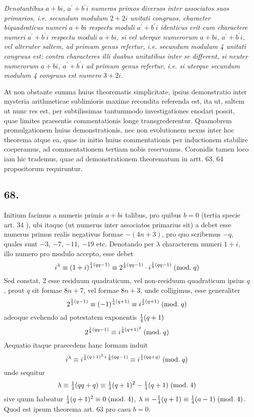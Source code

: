 \documentclass[twoside,12pt, showframe]{memoir}
\renewcommand{\pmod}[1]{\;(\textrm{mod.}\;#1)}
\let\oldfrac\frac
\def\frac#1#2{\mathchoice{\tfrac{#1}{#2}}{\oldfrac{#1}{#2}}{\genfrac{}{}{}{2}{#1}{#2\mathstrut}}{\genfrac{}{}{}{3}{#1}{#2\mathstrut}}}
\begin{document}
\textit{Denotantibus \(a+b i\), \( a^{\prime}+b^{\prime} i\) numeros primos diversos inter associatos suos primarios, i.e. secundum modulum \(2+2 i\) unitati congruos, character biquadraticus numeri \(a+b i\) respectu moduli \(a^{\prime}+b^{\prime} i\) identicus erit cum charactere numeri \(a^{\prime}+b^{\prime} i\) respectu moduli \(a+b i\), si vel uterque numerorum \(a+b i\), \(a^{\prime}+b^{\prime} i\), vel alteruter saltem, ad primum genus refertur, i.e. secundum modulum 4 unitati congruus est: contra characteres illi duabus unitatibus inter se different, si neuter numerorum \(a+b i\), \(a^{\prime}+b^{\prime} i\) ad primum genus refertur, i.e. si uterque secundum modulum 4 congruus est numero \(3+2 i\).}\clearpage\noindent%
 
At non obstante summa huius theorematis simplicitate, ipsius demonstratio inter mysteria arithmeticae sublimioris maxime recondita referenda est, ita ut, saltem ut nunc res est, per subtilissimas tantummodo investigationes enodari possit, quae limites praesentis commentationis longe transgrederentur. Quamobrem promulgationem huius demonstrationis, nec non evolutionem nexus inter hoc theorema atque ea, quae in initio huius commentationis per inductionem stabilire coeperamus, ad commentationem tertiam nobis reservamus. Coronidis tamen loco iam hic trademus, quae ad demonstrationem theorematum in artt. 63, 64 propositorum requiruntur.

\subsection*{68.}
 
Initium facimus a numeris primis \(a+b i\) talibus, pro quibus \(b=0\) (tertia specie art. 34 ), ubi itaque (ut numerus inter associatos primarius sit) a debet esse numerus primus realis negativus formae \(-(4 n+3)\), pro quo scribemus \(-q\), quales sunt \(-3\), \(-7\), \(-11\), \(-19\) etc. Denotando per \(\lambda\) characterem numeri \(1+i\), illo numero pro modulo accepto, esse debet
\[i^{\lambda} \equiv(1+i)^{\frac{1}{4}(q q-1)} \equiv 2^{\frac{1}{8}(q q-1)} \cdot i^{\frac{1}{8}(q q-1)}\pmod{q}\]
Sed constat, 2 esse residuum quadraticum, vel non-residuum quadraticum ipsius \(q\), prout \(q\) sit formae \(8 n+7\), vel formae \(8 n+3\), unde colligimus, esse generaliter
\[2^{\frac{1}{2}(q-1)} \equiv(-1)^{\frac{1}{4}(q+1)} \equiv i^{\frac{1}{2}(q+1)}\pmod{q}\]
adeoque evehendo ad potestatem exponentis \(\frac{1}{4}(q+1)\)
\[2^{\frac{1}{8}(q q-1)} \equiv i^{\frac{1}{8}(q+1)^{2}}\pmod{q}\]
Aequatio itaque praecedens hanc formam induit
\[i^{\lambda} \equiv i^{\frac{1}{8}(q+1)^{2}+\frac{1}{8}(q q-1)} \equiv i^{\frac{1}{4}(q q+q)}\pmod{q}\]
unde sequitur
\[\lambda \equiv \frac{1}{4}(q q+q) \equiv \frac{1}{4}(q+1)^{2}-\frac{1}{4}(q+1)\pmod{4}\]
sive quum habeatur \(\frac{1}{4}(q+1)^{2} \equiv 0\pmod{4}\), \( \lambda \equiv-\frac{1}{4}(q+1) \equiv \frac{1}{4}(a-1)\pmod{4}\).
Quod est ipsum theorema art. 63 pro casu \(b=0\).\clearpage\noindent%
\end{document}
